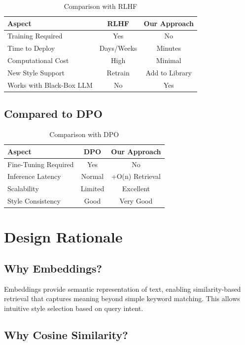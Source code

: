 \documentclass[11pt,a4paper]{article}
\begin{document}
\begin{table}[H]
\centering
\begin{tabular}{|l|c|c|}
\toprule
\textbf{Aspect} & \textbf{RLHF} & \textbf{Our Approach} \\
\midrule
Training Required & Yes & No \\
Time to Deploy & Days/Weeks & Minutes \\
Computational Cost & High & Minimal \\
New Style Support & Retrain & Add to Library \\
Works with Black-Box LLM & No & Yes \\
\bottomrule
\end{tabular}
\caption{Comparison with RLHF}
\end{table}

\subsection{Compared to DPO}

\begin{table}[H]
\centering
\begin{tabular}{|l|c|c|}
\toprule
\textbf{Aspect} & \textbf{DPO} & \textbf{Our Approach} \\
\midrule
Fine-Tuning Required & Yes & No \\
Inference Latency & Normal & +O(n) Retrieval \\
Scalability & Limited & Excellent \\
Style Consistency & Good & Very Good \\
\bottomrule
\end{tabular}
\caption{Comparison with DPO}
\end{table}

\section{Design Rationale}

\subsection{Why Embeddings?}

Embeddings provide semantic representation of text, enabling similarity-based retrieval that captures meaning beyond simple keyword matching. This allows intuitive style selection based on query intent.

\subsection{Why Cosine Similarity?}
\end{document}

